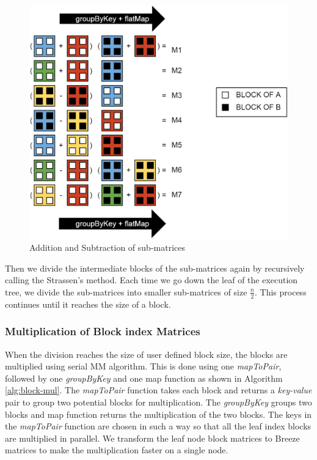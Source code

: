 \begin{figure}
  \includegraphics[scale=0.27]{images/add-sub.eps}
\caption{Addition and Subtraction of sub-matrices}
\label{fig:4}      
\end{figure}

Then we divide the intermediate blocks of the sub-matrices again by recursively calling the Strassen's method. Each time we go down the leaf of the execution tree, we divide the sub-matrices into smaller sub-matrices of size $\frac{n}{2}$. This process continues until it reaches the size of a block.

\subsubsection{Multiplication of Block index Matrices}
When the division reaches the size of user defined block size, the blocks are multiplied using serial MM algorithm. This is done using one \textit{mapToPair}, followed by one \textit{groupByKey} and one map function as shown in Algorithm \ref{alg:block-mul}. The \textit{mapToPair} function takes each block and returns a \textit{key-value} pair to group two potential blocks for multiplication. The \textit{groupByKey} groups two blocks and map function returns the multiplication of the two blocks. The keys in the \textit{mapToPair} function are chosen in such a way so that all the leaf index blocks are multiplied in parallel. We transform the leaf node block matrices to Breeze matrices to make the multiplication faster on a single node.

